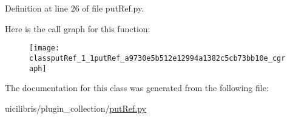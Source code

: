 \-Definition at line 26 of file put\-Ref.\-py.



\-Here is the call graph for this function\-:
\nopagebreak
\begin{figure}[H]
\begin{center}
\leavevmode
\texttt{[image: classputRef\_1\_1putRef\_a9730e5b512e12994a1382c5cb73bb10e\_cgraph]}
\end{center}
\end{figure}




\-The documentation for this class was generated from the following file\-:\begin{DoxyCompactItemize}
\item 
uicilibris/plugin\-\_\-collection/\hyperlink{putRef_8py}{put\-Ref.\-py}\end{DoxyCompactItemize}
